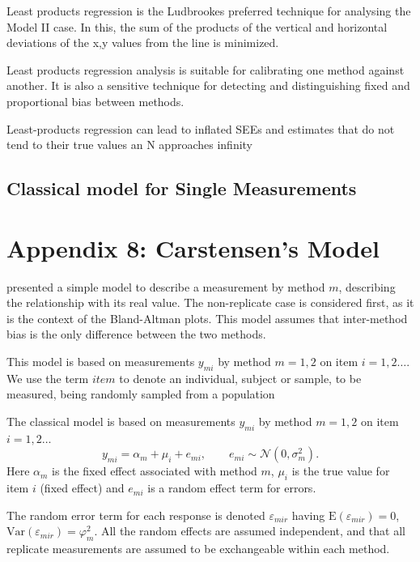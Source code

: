 \documentclass[12pt, a4paper]{report}
\theoremstyle{plain}
\theoremstyle{definition}
\theoremstyle{remark}
\begin{document}
Least products regression is the Ludbrookes preferred technique for analysing the Model II case. In this, the sum of the products of the vertical and horizontal deviations of the x,y values from the line is minimized.
		
Least products regression analysis is suitable for calibrating one method against another. It is also a sensitive technique for detecting and distinguishing fixed and proportional bias between
		methods.
		
		Least-products regression can lead to inflated SEEs and estimates that do not tend to their true values an N approaches infinity \citep{draper1998}


\subsection{Classical model for Single Measurements}
\section{Appendix 8: Carstensen's Model}
\citet{BXC2004} presented a simple model to describe a measurement by method $m$, describing the relationship with its real value. The non-replicate case is considered first, as it is the context of the Bland-Altman plots. This model assumes that inter-method bias is the only difference between the two methods.

This model is based on measurements $y_{mi}$ by method $m=1,2$ on item $i = 1,2 \ldots$. We use the term $item$ to denote an individual, subject or sample, to be measured, being randomly sampled from a population

The classical model is based on measurements $y_{mi}$ by method $m=1,2$ on item $i = 1,2 \ldots$
\begin{equation}
y_{mi}  = \alpha_{m} + \mu_{i} + e_{mi}, \qquad  e_{mi} \sim
\mathcal{N}(0,\sigma^{2}_{m}).
\end{equation}
Here $\alpha_m$ is the fixed effect associated with method $m$,
$\mu_i$ is the true value for item $i$ (fixed effect) and $e_{mi}$ is a random effect term for errors.

The random error term for each response is denoted $\varepsilon_{mir}$ having $\mathrm{E}(\varepsilon_{mir})=0$, $\mathrm{Var}(\varepsilon_{mir})=\varphi^2_m$. All the random effects are assumed independent, and that all replicate measurements are assumed to be exchangeable within each method.
	
	
\end{document}

